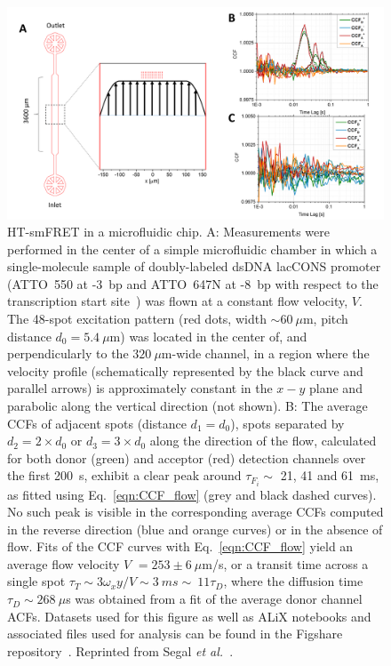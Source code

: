 \begin{figure}
\centering
\includegraphics[width=\textwidth]{chapters/figures/flow_analysis.png}
\caption{\label{fig:flow_analysis} 
\ac{HT-smFRET} in a microfluidic chip.
A: Measurements were performed in the center of a simple microfluidic chamber in which a single-molecule sample of 
doubly-labeled \ac{dsDNA} \ac{lacCONS} promoter (ATTO~550 at -3~\ac{bp} and ATTO~647N at -8~\ac{bp} with respect to the transcription start site~\cite{lerner_transcription_2017}) was flown at a constant flow velocity, $V$. 
The 48-spot excitation pattern (red dots, width $\sim60~\mu$m, pitch distance $d_0 = 5.4~\mu$m) was located in the center of, and perpendicularly to the $320~\mu$m-wide channel, in a region where the velocity profile (schematically represented by the black curve and parallel arrows) is approximately constant in the $x-y$ plane and parabolic along the vertical direction (not shown).
B: The average \ac{CCF}s of adjacent spots (distance $d_1 = d_0$), spots separated by $d_2 = 2 \times d_0$
or $d_3 = 3 \times d_0$ along the direction of the flow, calculated for both donor (green) and acceptor (red) detection channels over the first 200~s, exhibit a clear peak around $\tau_{F_i} \sim$ 21, 41 and 61~ms, as fitted using Eq.~\ref{eqn:CCF_flow} (grey and black dashed curves).
No such peak is visible in the corresponding average \ac{CCF}s computed in the reverse direction (blue and orange curves) or in the absence of flow. 
Fits of the \ac{CCF} curves with Eq.~\ref{eqn:CCF_flow} yield an average flow velocity $V$ {$=253 \pm 6~\mu$}m/s, or a transit time across a single spot $\tau_T \sim 3 \omega_xy/V \sim 3~ms \sim ~11 \tau_D$, where the diffusion time $\tau_D \sim 268~\mu$s was obtained from a fit of the average donor channel \ac{ACF}s.
Datasets used for this figure as well as ALiX notebooks and associated files used for analysis can be found in the Figshare repository~\cite{figshare_repo_2019}.
Reprinted from Segal \textit{et al.}~\cite{segal_methods_2019}.
}
\end{figure}

